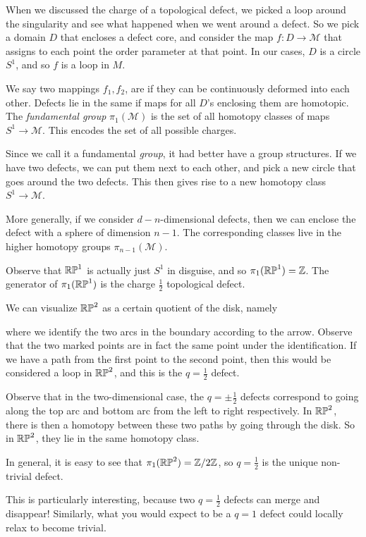 \documentclass[a4paper]{article}
\begin{document}
When we discussed the charge of a topological defect, we picked a loop around the singularity and see what happened when we went around a defect. So we pick a domain $D$ that encloses a defect core, and consider the map $f: D \to \mathcal{M}$ that assigns to each point the order parameter at that point. In our cases, $D$ is a circle $S^1$, and so $f$ is a loop in $M$.

We say two mappings $f_1, f_2$, are  if they can be continuously deformed into each other. Defects lie in the same  if maps for all $D$'s enclosing them are homotopic. The \emph{fundamental group} $\pi_1(\mathcal{M})$ is the set of all homotopy classes of maps $S^1 \to \mathcal{M}$. This encodes the set of all possible charges.

Since we call it a fundamental \emph{group}, it had better have a group structures. If we have two defects, we can put them next to each other, and pick a new circle that goes around the two defects. This then gives rise to a new homotopy class $S^1 \to \mathcal{M}$.

More generally, if we consider $d - n$-dimensional defects, then we can enclose the defect with a sphere of dimension $n - 1$. The corresponding classes live in the higher homotopy groups $\pi_{n - 1}(\mathcal{M})$.

\begin{eg}
  Observe that $\mathbb{RP}^1$ is actually just $S^1$ in disguise, and so $\pi_1(\mathbb{RP}^1) = \mathbb{Z}$. The generator of $\pi_1(\mathbb{RP}^1)$ is the charge $\frac{1}{2}$ topological defect.
\end{eg}

\begin{eg}
  We can visualize $\mathbb{RP}^2$ as a certain quotient of the disk, namely
  \begin{center}
  \end{center}
  where we identify the two arcs in the boundary according to the arrow. Observe that the two marked points are in fact the same point under the identification. If we have a path from the first point to the second point, then this would be considered a loop in $\mathbb{RP}^2$, and this is the $q = \frac{1}{2}$ defect.

  Observe that in the two-dimensional case, the $q = \pm \frac{1}{2}$ defects correspond to going along the top arc and bottom arc from the left to right respectively. In $\mathbb{RP}^2$, there is then a homotopy between these two paths by going through the disk. So in $\mathbb{RP}^2$, they lie in the same homotopy class.

  In general, it is easy to see that $\pi_1(\mathbb{RP}^2) = \mathbb{Z}/2\mathbb{Z}$, so $q = \frac{1}{2}$ is the unique non-trivial defect.
\end{eg}
This is particularly interesting, because two $q = \frac{1}{2}$ defects can merge and disappear! Similarly, what you would expect to be a $q = 1$ defect could locally relax to become trivial.
\end{document}
